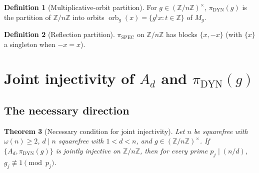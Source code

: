 \documentclass[11pt,reqno]{amsart}
\theoremstyle{plain}
\newtheorem{theorem}{Theorem}[section]
\theoremstyle{definition}
\newtheorem{definition}[theorem]{Definition}
\theoremstyle{remark}
\DeclareMathOperator{\orb}{orb}
\DeclareMathOperator{\spec}{SPEC}
\DeclareMathOperator{\dyn}{DYN}
\newcommand{\Z}{\mathbb{Z}}
\begin{document}
\begin{definition}[Multiplicative-orbit partition]\label{def:dyn}
For $g \in (\Z/n\Z)^{\times}$, $\pi_{\dyn}(g)$ is the partition of
$\Z/n\Z$ into orbits $\orb_{g}(x) = \{g^{t} x : t \in \Z\}$ of $M_{g}$.
\end{definition}

\begin{definition}[Reflection partition]\label{def:spec}
$\pi_{\spec}$ on $\Z/n\Z$ has blocks $\{x, -x\}$ (with $\{x\}$ a
singleton when $-x = x$).
\end{definition}

\section{Joint injectivity of $A_{d}$ and $\pi_{\dyn}(g)$}\label{sec:joint}

\subsection{The necessary direction}

\begin{theorem}[Necessary condition for joint injectivity]\label{thm:joint-necessary}
Let $n$ be squarefree with $\omega(n) \ge 2$, $d \mid n$ squarefree
with $1 < d < n$, and $g \in (\Z/n\Z)^{\times}$. If $\{A_{d},
\pi_{\dyn}(g)\}$ is jointly injective on $\Z/n\Z$, then for every
prime $p_{j} \mid (n/d)$, $g_{j} \not\equiv 1 \pmod{p_{j}}$.
\end{theorem}
\end{document}
